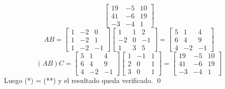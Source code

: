 \begin{enumerate}[topsep=6pt,itemsep=.4cm]
\begin{equation*}
    \begin{bmatrix}19 & -5 & 10 \\41 & -6 & 19 \\-3 & -4 & 1\end{bmatrix} \tag{*}
\end{equation*}
\begin{equation*}
    AB = \begin{bmatrix} 1&-2&0\\ 1&-2&1\\ 1&-2&-1\end{bmatrix} \begin{bmatrix}1&1&2\\ -2&0&-1\\ 1&3&5 \end{bmatrix} =
    \begin{bmatrix}5 &1 &4\\ 6&4&9\\ 4&-2&-1 \end{bmatrix}
\end{equation*}
\begin{equation*}
    (AB)C = \begin{bmatrix}5 &1 &4\\ 6&4&9\\ 4&-2&-1 \end{bmatrix}\begin{bmatrix}1&-1&1\\ 2&0&1\\ 3&0&1 \end{bmatrix} =
    \begin{bmatrix}19 & -5 & 10 \\41 & -6 & 19 \\-3 & -4 & 1\end{bmatrix} \tag{**}
\end{equation*}
Luego (*) = (**) y el resultado queda verificado. \qed



\end{enumerate}
